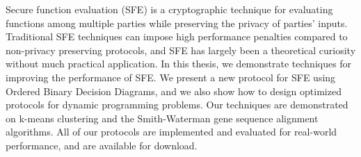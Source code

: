 Secure function evaluation (SFE) is a cryptographic technique for evaluating
functions among multiple parties while preserving the privacy of parties'
inputs.  Traditional SFE techniques can impose high performance penalties 
compared to non-privacy preserving protocols, and SFE has largely been a
theoretical curiosity without much practical application.  In this thesis, 
we demonstrate techniques for improving the performance of SFE.  We present
a new protocol for SFE using Ordered Binary Decision Diagrams, and we also
show how to design optimized protocols for dynamic programming problems.
Our techniques are demonstrated on k-means clustering and the Smith-Waterman
gene sequence alignment algorithms.  All of our protocols are implemented and
evaluated for real-world performance, and are available for download.
